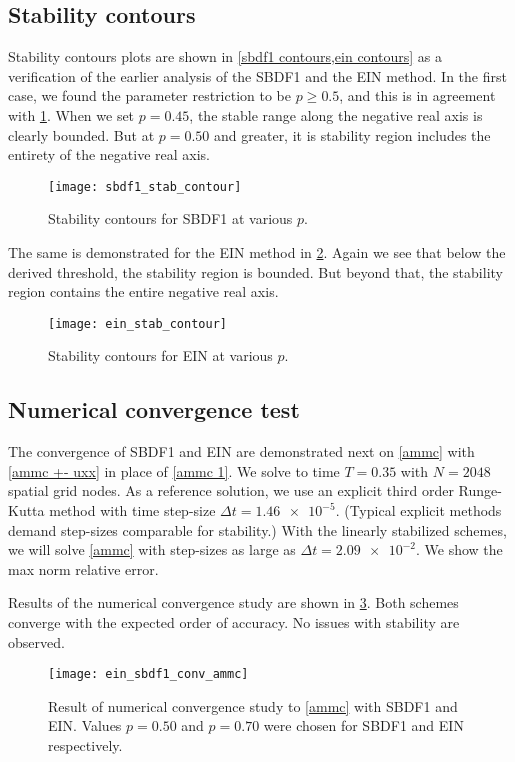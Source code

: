 \subsection{Stability contours}
Stability contours plots are shown in \cref{sbdf1 contours,ein contours} as a verification of the earlier analysis of the SBDF1 and the EIN method. In the first case, we found the parameter restriction to be $p\geq 0.5$, and this is in agreement with \cref{sbdf1 contours}. When we set $p=0.45$, the stable range along the negative real axis is clearly bounded. But at $p=0.50$ and greater, it is stability region includes the entirety of the negative real axis.
\begin{figure}[htb!]
        \centering
\texttt{[image: sbdf1\_stab\_contour]}
\caption{Stability contours for SBDF1 at various $p$.}
\label{sbdf1 contours}
\end{figure}

The same is demonstrated for the EIN method in \cref{ein contours}. Again we see that below the derived threshold, the stability region is bounded. But beyond that, the stability region contains the entire negative real axis.
\begin{figure}[htb!]
        \centering
\texttt{[image: ein\_stab\_contour]}
\caption{Stability contours for EIN at various $p$.}
\label{ein contours}
\end{figure}

\subsection{Numerical convergence test}
\label{ein conv test}
The convergence of SBDF1 and EIN are demonstrated next on \cref{ammc} with \cref{ammc +- uxx} in place of \eqref{ammc 1}. We solve to time $T=0.35$ with $N=2048$ spatial grid nodes. As a reference solution, we use an explicit third order Runge-Kutta method with time step-size $\Delta t=\num{1.46e-5}$. (Typical explicit methods demand step-sizes comparable for stability.) With the linearly stabilized schemes, we will solve \cref{ammc} with step-sizes as large as $\Delta t = \num{2.09e-2}$. We show the max norm relative error.

Results of the numerical convergence study are shown in \cref{ein_sbdf1_conv_ammc}. Both schemes converge with the expected order of accuracy. No issues with stability are observed.
\begin{figure}[htb!]
        \centering
\texttt{[image: ein\_sbdf1\_conv\_ammc]}
\caption[Numerical convergence study with SBDF1 and EIN]{Result of numerical convergence study to \cref{ammc} with SBDF1 and EIN. Values $p=0.50$ and $p=0.70$ were chosen for SBDF1 and EIN respectively.}
\label{ein_sbdf1_conv_ammc}
\end{figure}
